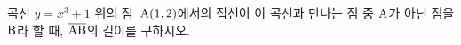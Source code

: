 곡선 $y=x^3+1$ 위의 점~$\mathrm{A}(1{,}\mkern3mu\mathopen{}2)$에서의 접선이 이 곡선과 만나는 점 중 $\mathrm{A}$가 아닌 점을 $\mathrm{B}$라 할 때, $\overline{\mathrm{AB}}$의 길이를 구하시오.
